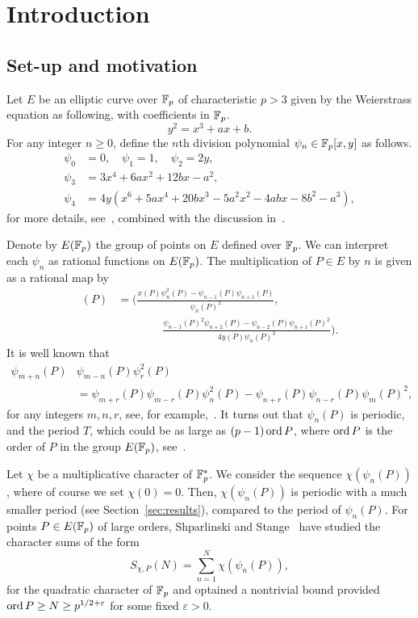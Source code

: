 \documentclass[12pt]{amsart}
\begin{document}
\section{Introduction}
\subsection{Set-up and motivation}
Let $ E $ be an elliptic curve over $ {\mathbb F}_p $ of characteristic $ p > 3 $ given by the Weierstrass equation as following, with coefficients in ${\mathbb F}_p$.
\[
y^2=x^3+ax+b.
\]
For any integer $n\geq0$, define the $n$th division polynomial $\psi_n\in{\mathbb F}_p[x,y]$ as follows.
\begin{align*}
\psi_0 &= 0, \quad \psi_1 = 1, \quad \psi_2 = 2y, \\
\psi_3 &= 3x^4 + 6a x^2 + 12b x - a^2, \\
\psi_4 &= 4y(x^6 + 5a x^4 + 20b x^3 - 5a^2 x^2 - 4abx - 8b^2 - a^3),
\end{align*}
for more details, see~\cite[Exercise~3.7]{Silv2}, combined with the discussion in~\cite[Chapter~III.1]{Silv2}.


Denote by $ E({\mathbb F}_p) $ the group of points on $ E $ defined over $ {\mathbb F}_p $. We can interpret each $\psi_n$ as rational functions on $E({\mathbb F}_p)$. The multiplication of $P \in E$ by $n$ is given as a rational map by 
\begin{align*}
[n](P) &=
\biggl(
\frac{x(P)\psi_n^2(P)  - \psi_{n-1}(P)\psi_{n+1}(P)}{\psi_n(P)^2}, \\
& \qquad \qquad \frac{\psi_{n-1}(P)^2\psi_{n+2}(P) - \psi_{n-2}(P)\psi_{n+1}(P)^2}{4y(P)\psi_n(P)^3}
\biggr).
\end{align*}
It is well known that
\begin{align*}
\psi_{m+n}(P)&\psi_{m-n}(P)\psi_r^2(P)\\
& =\psi_{m+r}(P)\psi_{m-r}(P)\psi_n^2(P)-\psi_{n+r}(P)\psi_{n-r}(P)\psi_m(P)^2,
\end{align*}
for any integers $m,n,r$, see, for example,~\cite[Exercise~3.7(g)]{Silv2}.
 It turns out that $\psi_n(P)$ is periodic, and the period $T$, which  could be as large as $(p-1) \operatorname{ord} P$, 
 where $\operatorname{ord} P$ is the order of $P$ in the group  $ E({\mathbb F}_p) $, see~\cite[Corollary~9]{Silv1}.   
 
Let $\chi$ be a multiplicative character of ${\mathbb F}_p^{*}$. We consider the sequence $\chi(\psi_n(P))$, where of course we set $\chi(0)=0$. Then, $\chi(\psi_n(P))$ is periodic with a much smaller period (see Section~\ref{sec:results}), compared to the period of $\psi_n(P)$. For points $P\in E({\mathbb F}_p)$ of large orders, Shparlinski and Stange~\cite{ShSt} have studied the character sums of the form 
\[
S_{\chi,P}(N) =  \sum_{n=1}^N \chi(\psi_n(P)),
\]
for the quadratic character of ${\mathbb F}_p$ and optained a nontrivial bound provided $\operatorname{ord} P \ge N \ge p^{1/2 +\varepsilon}$ for some fixed $\varepsilon > 0$. 
\end{document}
